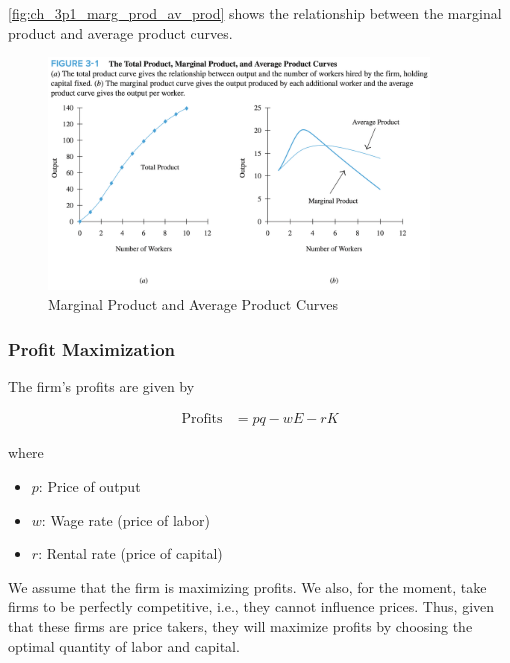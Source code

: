 \FloatBarrier

\autoref{fig:ch_3p1_marg_prod_av_prod}
shows the relationship between the marginal product
and average product curves.

\FloatBarrier

\begin{figure}[!htb]
    \centering
        \includegraphics[width=0.9\textwidth]{../input/ch_3p1_marg_prod_av_prod.png}
    \caption{Marginal Product and Average Product Curves}
    \label{fig:ch_3p1_marg_prod_av_prod}
\end{figure}

\FloatBarrier

\subsubsection{Profit Maximization}


The firm's profits are given by

\begin{align}
    \text{Profits} &= p q - w E - r K
\end{align}

where 

\begin{itemize}
    \item $p$: Price of output
    \item $w$: Wage rate (price of labor)
    \item $r$: Rental rate (price of capital)
\end{itemize}

We assume that the firm is maximizing profits.
We also, for the moment, take firms to be 
perfectly competitive, i.e., they cannot influence prices. 
Thus, given that these firms are price takers,
they will maximize profits by 
choosing the optimal quantity of labor 
and capital.


